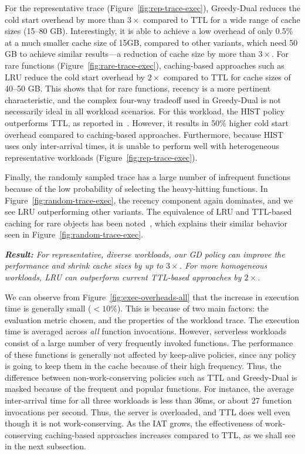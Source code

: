 For the representative trace (Figure~\ref{fig:rep-trace-exec}), Greedy-Dual reduces the cold start overhead by more than $3\times$ compared to TTL for a wide range of cache sizes (15--80 GB). 
Interestingly, it is able to achieve a low overhead of only 0.5\% at a much smaller cache size of 15GB, compared to other variants, which need 50 GB to achieve similar results---a reduction of cache size by more than $3\times$. 
%
For rare functions (Figure~\ref{fig:rare-trace-exec}), caching-based approaches such as LRU  reduce the cold start overhead by $2\times$ compared to TTL for cache sizes of 40--50 GB. 
This shows that for rare functions, recency is a more pertinent characteristic, and the complex four-way tradeoff used in Greedy-Dual is not necessarily ideal in all workload scenarios. 
For this workload, the HIST policy outperforms TTL, as reported in~\cite{shahrad_serverless_2020}. 
However, it results in 50\% higher cold start overhead compared to caching-based approaches.
Furthermore, because HIST uses only inter-arrival times, it is unable to perform well with heterogeneous representative workloads  (Figure~\ref{fig:rep-trace-exec}). 


Finally, the randomly sampled trace has a large number of infrequent functions because of the low probability of selecting the heavy-hitting functions.
In Figure~\ref{fig:random-trace-exec}, the recency component again dominates, and we see LRU outperforming other variants. 
The equivalence of LRU and TTL-based caching for rare objects has been noted~\cite{basu2017adaptive,jiang2018convergence}, which explains their similar behavior seen in Figure~\ref{fig:random-trace-exec}. 


\noindent \emph{\textbf{Result:} For representative, diverse workloads, our GD policy can improve the performance and shrink cache sizes by up to $3\times$. For more homogeneous workloads, LRU can outperform current TTL-based approaches by $2\times$.}

We can observe from Figure~\ref{fig:exec-overheads-all} that the increase in execution time is generally small ($<10\%$).
This is because of two main factors: the evaluation metric chosen, and the properties of the workload trace. 
The execution time is averaged across \emph{all} function invocations.
However, serverless workloads consist of a large number of very frequently invoked functions. 
The performance of these functions is generally not affected by keep-alive policies, since any policy is going to keep them in the cache because of their high frequency. 
Thus, the difference between non-work-conserving policies such as TTL and Greedy-Dual is masked because of the frequent and popular functions. 
For instance, the average inter-arrival time for all three workloads is less than 36ms, or about 27 function invocations per second. 
Thus, the server is overloaded, and TTL does well even though it is not work-conserving. 
As the IAT grows, the effectiveness of work-conserving caching-based approaches increases compared to TTL, as we shall see in the next subsection. 

